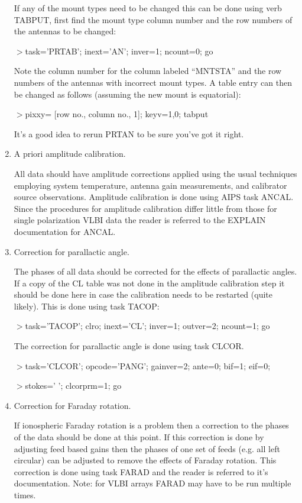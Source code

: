 \begin{enumerate}
   If any of the mount types need to be changed this can be done using
verb TABPUT, first find the mount type column number and the row
numbers of the antennas to be changed:
\par\noindent
$>$task='PRTAB'; inext='AN'; inver=1; ncount=0; go
\par\noindent
Note the column number for the column labeled ``MNTSTA'' and the row
numbers of the antennas with incorrect mount types.  A table entry
can then be changed as follows (assuming the new mount is equatorial):
\par\noindent
$>$pixxy= [row no., column no., 1]; keyv=1,0; tabput
\par\noindent
It's a good idea to rerun PRTAN to be sure you've got it right.


\item A priori amplitude calibration.

   All data should have amplitude corrections applied using the usual
techniques employing system temperature, antenna gain measurements,
and calibrator source observations.  Amplitude calibration is done
using AIPS task ANCAL.  Since the procedures for amplitude calibration
differ little from those for single polarization VLBI data the reader
is referred to the EXPLAIN documentation for ANCAL.

\item Correction for parallactic angle.

   The phases of all data should be corrected for the effects of
parallactic angles.  If a copy of the CL table was not done in the
amplitude calibration step it should be done here in case the
calibration needs to be restarted (quite likely).  This is done using
task TACOP:
\par\noindent
$>$task='TACOP'; clro; inext='CL'; inver=1; outver=2; ncount=1; go

The correction for parallactic  angle is done using task CLCOR.
\par\noindent
$>$task='CLCOR'; opcode='PANG'; gainver=2; ante=0; bif=1; eif=0;
\par\noindent
$>$stokes=' '; clcorprm=1; go

\item Correction for Faraday rotation.

   If ionospheric Faraday rotation is a problem then a correction to
the phases of the data should be done at this point.  If this
correction is done by adjusting feed based gains then the phases of
one set of feeds (e.g. all left circular) can be adjusted to remove
the effects of Faraday rotation.  This correction is done using task
FARAD and the reader is referred to it's documentation.  Note: for
VLBI arrays FARAD may have to be run multiple times.


\end{enumerate}
